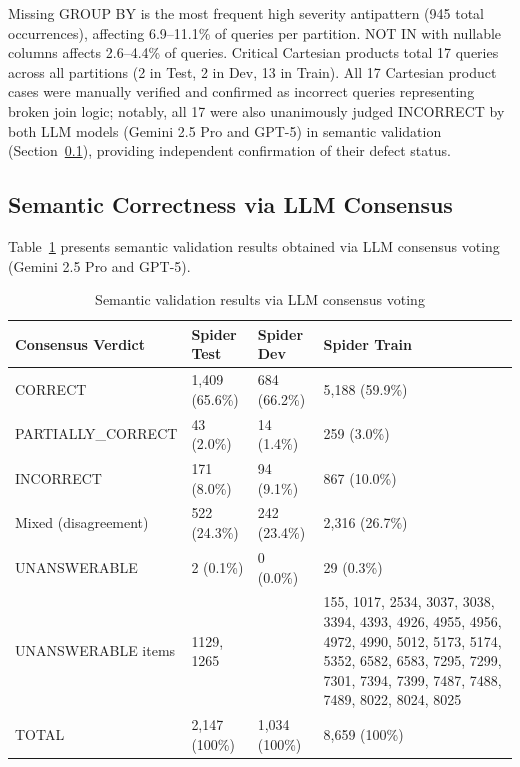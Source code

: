 \documentclass[]{einformatica}
\begin{document}
Missing GROUP BY is the most frequent high severity antipattern (945 total occurrences), affecting 6.9--11.1\% of queries per partition. NOT IN with nullable columns affects 2.6--4.4\% of queries. Critical Cartesian products total 17 queries across all partitions (2 in Test, 2 in Dev, 13 in Train). All 17 Cartesian product cases were manually verified and confirmed as incorrect queries representing broken join logic; notably, all 17 were also unanimously judged INCORRECT by both LLM models (Gemini 2.5 Pro and GPT-5) in semantic validation (Section~\ref{sec:semantic_results}), providing independent confirmation of their defect status.

\subsection{Semantic Correctness via LLM Consensus}\label{sec:semantic_results}

Table~\ref{tab:semantic} presents semantic validation results obtained via LLM consensus voting (Gemini 2.5 Pro and GPT-5).

\begin{table}[ht]
    \caption{Semantic validation results via LLM consensus voting}
    \label{tab:semantic}
    \centering
    \footnotesize
    \begin{tabular}{lp{}p{}p{}}
        \toprule
        \textbf{Consensus Verdict} & \textbf{Spider Test} & \textbf{Spider Dev} & \textbf{Spider Train} \\
        \midrule
        CORRECT & 1,409 (65.6\%) & 684 (66.2\%) & 5,188 (59.9\%) \\
        PARTIALLY\_CORRECT & 43 (2.0\%) & 14 (1.4\%) & 259 (3.0\%) \\
        INCORRECT & 171 (8.0\%) & 94 (9.1\%) & 867 (10.0\%) \\
        Mixed (disagreement) & 522 (24.3\%) & 242 (23.4\%) & 2,316 (26.7\%) \\
        UNANSWERABLE & 2 (0.1\%) & 0 (0.0\%) & 29 (0.3\%) \\
        UNANSWERABLE items & 1129, 1265 &  & 155, 1017, 2534, 3037, 3038, 3394, 4393, 4926, 4955, 4956, 4972, 4990, 5012, 5173, 5174, 5352, 6582, 6583, 7295, 7299, 7301, 7394, 7399, 7487, 7488, 7489, 8022, 8024, 8025 \\
        TOTAL & 2,147 (100\%) & 1,034 (100\%) & 8,659 (100\%) \\
        \bottomrule
    \end{tabular}
\end{table}
\end{document}
